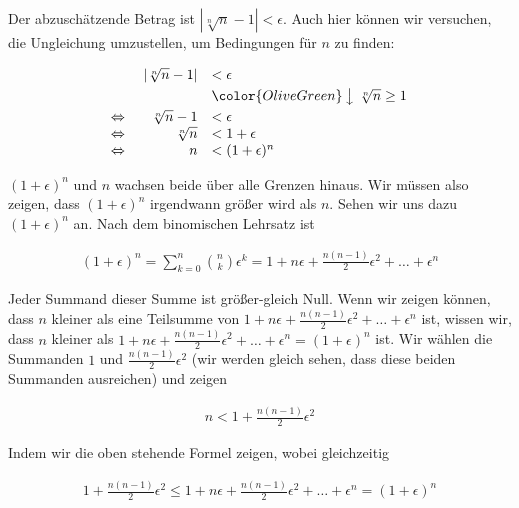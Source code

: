 \documentclass[fontsize=9pt,
               parskip=half-,
               DIV=14,
               listof=chapterentry,
               tocflat]{scrbook}
\begin{document}
\begin{solutionprocess*}
Der abzuschätzende Betrag ist $\left|{\sqrt[{n}]{n}}-1\right|<\epsilon $. Auch hier können wir versuchen, die Ungleichung umzustellen, um Bedingungen für $n$ zu finden:

\begin{align*}
{\begin{array}{rrl}&\left|{\sqrt[{n}]{n}}-1\right|&<\epsilon \\[0.3em]&&{\color {OliveGreen}\left\downarrow \ {\sqrt[{n}]{n}}\geq 1\right.}\\[0.3em]\Leftrightarrow \ &{\sqrt[{n}]{n}}-1&<\epsilon \\\Leftrightarrow \ &{\sqrt[{n}]{n}}&<1+\epsilon \\\Leftrightarrow \ &n&<(1+\epsilon )^{n}\\\end{array}}
\end{align*}

$(1+\epsilon )^{n}$ und $n$ wachsen beide über alle Grenzen hinaus. Wir müssen also zeigen, dass $(1+\epsilon )^{n}$ irgendwann größer wird als $n$. Sehen wir uns dazu $(1+\epsilon )^{n}$ an. Nach dem binomischen Lehrsatz ist

\begin{align*}
(1+\epsilon )^{n}=\sum _{k=0}^{n}{\binom {n}{k}}\epsilon ^{k}=1+n\epsilon +{\frac {n(n-1)}{2}}\epsilon ^{2}+\ldots +\epsilon ^{n}
\end{align*}

Jeder Summand dieser Summe ist größer-gleich Null. Wenn wir zeigen können, dass $n$ kleiner als eine Teilsumme von $1+n\epsilon +{\frac {n(n-1)}{2}}\epsilon ^{2}+\ldots +\epsilon ^{n}$ ist, wissen wir, dass $n$ kleiner als $1+n\epsilon +{\frac {n(n-1)}{2}}\epsilon ^{2}+\ldots +\epsilon ^{n}=(1+\epsilon )^{n}$ ist. Wir wählen die Summanden $1$ und ${\tfrac {n(n-1)}{2}}\epsilon ^{2}$ (wir werden gleich sehen, dass diese beiden Summanden ausreichen) und zeigen

\begin{align*}
n<1+{\frac {n(n-1)}{2}}\epsilon ^{2}
\end{align*}

Indem wir die oben stehende Formel zeigen, wobei gleichzeitig

\begin{align*}
1+{\frac {n(n-1)}{2}}\epsilon ^{2}\leq 1+n\epsilon +{\frac {n(n-1)}{2}}\epsilon ^{2}+\ldots +\epsilon ^{n}=(1+\epsilon )^{n}
\end{align*}


\end{solutionprocess*}
\end{document}
